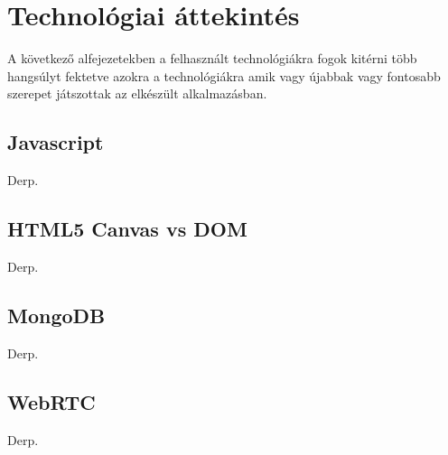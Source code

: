 



\chapter{Technológiai áttekintés}
A következő alfejezetekben a felhasznált technológiákra fogok kitérni több hangsúlyt fektetve azokra a technológiákra amik vagy újabbak vagy fontosabb szerepet játszottak az elkészült alkalmazásban.


\section{Javascript}
Derp.

\section{HTML5 Canvas vs DOM}
Derp.



\section{MongoDB}
Derp.







\section{WebRTC}
Derp.

